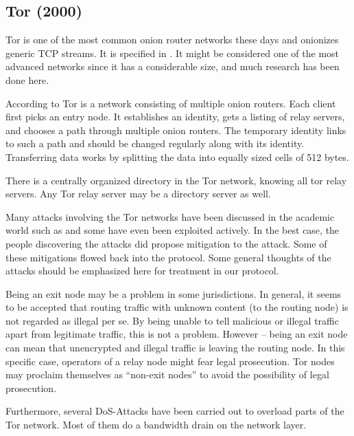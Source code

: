 \subsection{Tor (2000)}\label{sec:tor}
Tor is one of the most common onion router networks these days and onionizes generic TCP streams. It is specified in \cite{tor-spec}. It might be considered one of the most advanced networks since it has a considerable size, and much research has been done here.

According to \cite{onion-routing:pet2000} Tor is a network consisting of multiple onion routers. Each client first picks an entry node. It establishes an identity, gets a listing of relay servers, and chooses a path through multiple onion routers. The temporary identity links to such a path and should be changed regularly along with its identity. Transferring data works by splitting the data into equally sized cells of 512 bytes.

There is a centrally organized directory in the Tor network, knowing all tor relay servers. Any Tor relay server may be a directory server as well. 

Many attacks involving the Tor networks have been discussed in the academic world such as \cite{hs-attack06,esorics13-cellflood,bauer:wpes2007,esorics12-torscan,oakland2013-trawling,danner-et-al:tissec12,congestion-longpaths} and some have even been exploited actively. In the best case, the people discovering the attacks did propose mitigation to the attack. Some of these mitigations flowed back into the protocol. Some general thoughts of the attacks should be emphasized here for treatment in our protocol.

Being an exit node may be a problem in some jurisdictions. In general, it seems to be accepted that routing traffic with unknown content (to the routing node) is not regarded as illegal per se. By being unable to tell malicious or illegal traffic apart from legitimate traffic, this is not a problem. However -- being an exit node can mean that unencrypted and illegal traffic is leaving the routing node. In this specific case, operators of a relay node might fear legal prosecution. Tor nodes may proclaim themselves as  ``non-exit nodes''  to avoid the possibility of legal prosecution.

Furthermore, several DoS-Attacks have been carried out to overload parts of the Tor network. Most of them do a bandwidth drain on the network layer.

